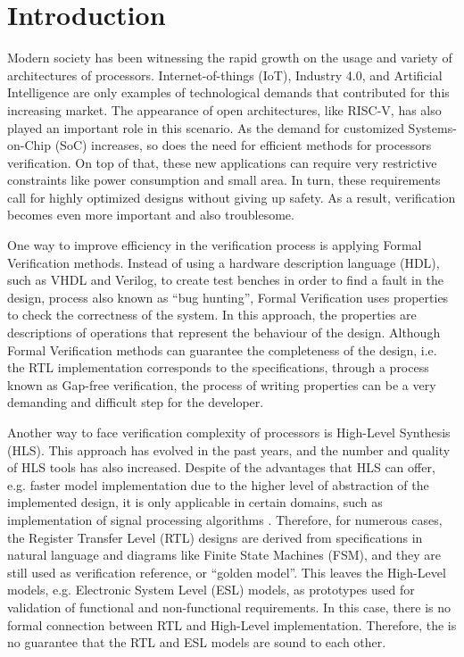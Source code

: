 \chapter{Introduction}

Modern society has been witnessing the rapid growth on the usage and variety of architectures of processors. Internet-of-things (IoT), Industry 4.0, and Artificial Intelligence are only examples of technological demands that contributed for this increasing market. The appearance of open architectures, like RISC-V, has also played an important role in this scenario. As the demand for customized Systems-on-Chip (SoC) increases, so does the need for efficient methods for processors verification. On top of that, these new applications can require very restrictive constraints like power consumption and small area. In turn, these requirements call for highly optimized designs without giving up safety. As a result, verification becomes even more important and also troublesome.

One way to improve efficiency in the verification process is applying Formal Verification methods. Instead of using a hardware description language (HDL), such as VHDL and Verilog, to create test benches in order to find a fault in the design, process also known as “bug hunting”, Formal Verification uses properties to check the correctness of the system. In this approach, the properties are descriptions of operations that represent the behaviour of the design. Although Formal Verification methods can guarantee the completeness of the design, i.e. the RTL implementation corresponds to the specifications, through a process known as Gap-free verification, the process of writing properties can be a very demanding and difficult step for the developer. 

Another way to face verification complexity of processors is High-Level Synthesis (HLS). This approach has evolved in the past years, and the number and quality of HLS tools has also increased. Despite of the advantages that HLS can offer, e.g. faster model implementation due to the higher level of abstraction of the implemented design, it is only applicable in certain domains, such as implementation of signal processing algorithms \cite{paper-pdd}. Therefore, for numerous cases, the Register Transfer Level (RTL) designs are derived from specifications in natural language and diagrams like Finite State Machines (FSM), and they are still used as verification reference, or “golden model”. This leaves the High-Level models, e.g. Electronic System Level (ESL) models, as prototypes used for validation of functional and non-functional requirements. In this case, there is no formal connection between RTL and High-Level implementation. Therefore, the is no guarantee that the RTL and ESL models are sound to each other. 

